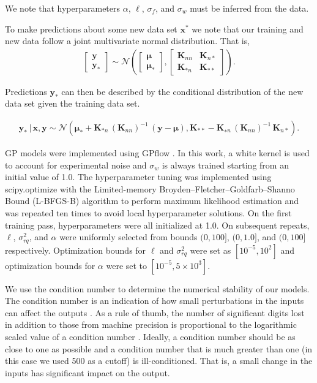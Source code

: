 \documentclass[journal=jacsat,manuscript=article]{achemso}
\newcommand{\xvec}{\ensuremath{\mathbf{x}}}
\begin{document}
{We note that hyperparameters $\alpha$, $\ell$, $\sigma_{f}$, and $\sigma_{w}$ must be inferred from the data. 

To make predictions about some new data set $\xvec^*$ we note that our training and new data follow a joint multivariate normal distribution. That is,
\begin{gather*}
    \begin{bmatrix}
        \mathbf{y} \\
        \mathbf{y}_*
    \end{bmatrix}
    \sim 
    \mathcal{N}\left(
    \begin{bmatrix}
        \boldsymbol{\mu}\\
        \boldsymbol{\mu}_*
    \end{bmatrix},
    \begin{bmatrix}
        \mathbf{K}_{nn} & \mathbf{K}_{n*} \\
        \mathbf{K}_{*n} & \mathbf{K}_{**}
    \end{bmatrix} \right).
\end{gather*}

\noindent Predictions $\mathbf{y}_*$ can then be described by the conditional distribution of the new data set given the training data set.

\begin{gather}
    \mathbf{y}_* \,|\, \xvec, \mathbf{y} \sim \mathcal{N}(\boldsymbol{\mu}_* + \mathbf{K}_{*n}\,(\mathbf{K}_{nn})^{-1}\,(\mathbf{y}-\boldsymbol{\mu}), \mathbf{K}_{**} - \mathbf{K}_{∗n} \,(\mathbf{K}_{nn})^{-1}\,\mathbf{K}_{n*}).   
\end{gather}

GP models were implemented using GPflow \cite{Matthews2017GPflow:TensorFlow}. In this work, a white kernel is used to account for experimental noise and $\sigma_w$ is always trained starting from an initial value of 1.0. The hyperparameter tuning was implemented using scipy.optimize \cite{Virtanen2020SciPyPython} with the Limited-memory Broyden–Fletcher–Goldfarb–Shanno Bound (L-BFGS-B) algorithm to perform maximum likelihood estimation and was repeated ten times to avoid local hyperparameter solutions. On the first training pass, hyperparameters were all initialized at 1.0. On subsequent repeats, $\ell$, $\sigma^2_{rq}$, and $\alpha$ were uniformly selected from bounds $(0, 100]$, $(0, 1.0]$, and $(0, 100]$  respectively. Optimization bounds for $\ell$ and $\sigma^2_{rq}$ were set as $[10^{-5}, 10^2]$ and optimization bounds for $\alpha$ were set to $[10^{-5}, 5\times 10^3]$.

We use the condition number to determine the numerical stability of our models. The condition number is an indication of how small perturbations in the inputs can affect the outputs \cite{Foster2009}. As a rule of thumb, the number of significant digits lost in addition to those from machine precision is proportional to the logarithmic scaled value of a condition number \cite{NumMathComput}. Ideally, a condition number should be as close to one as possible and a condition number that is much greater than one (in this case we used 500 as a cutoff) is ill-conditioned. That is, a small change in the inputs has significant impact on the output.}
\end{document}
